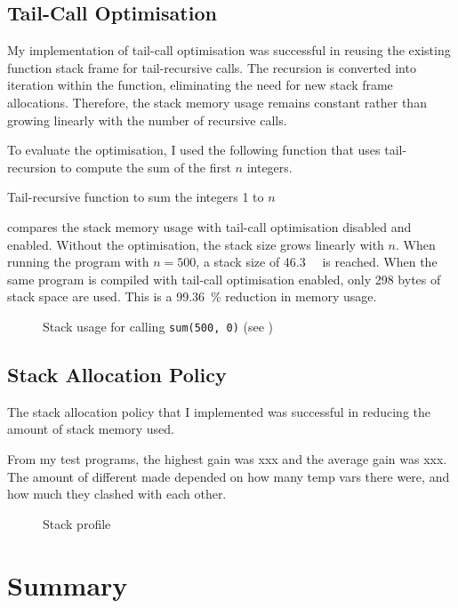 \documentclass[00-main.tex]{subfiles}
\begin{document}
\newcommand{\stackplot}[1]{\fbox{\resizebox{0.98\textwidth}{!}{}}}

\subsection{Tail-Call Optimisation}

My implementation of tail-call optimisation was successful in reusing the existing function stack frame for tail-recursive calls. The recursion is converted into iteration within the function, eliminating the need for new stack frame allocations.
Therefore, the stack memory usage remains constant rather than growing linearly with the number of recursive calls.

To evaluate the optimisation, I used the following function that uses tail-recursion to compute the sum of the first $n$ integers.

\begin{listing}[h]
  \caption{Tail-recursive function to sum the integers 1 to $n$}
  \label{lst:tail-recursive sum}
\end{listing}


 compares the stack memory usage with tail-call optimisation disabled and enabled.
Without the optimisation, the stack size grows linearly with $n$.
When running the program with $n=500$, a stack size of \SI{46.3}{\kilo\byte} is reached.
When the same program is compiled with tail-call optimisation enabled, only 298 bytes of stack space are used.
This is a \SI{99.36}{\percent} reduction in memory usage.

\begin{figure}[h]
  \centering
  \stackplot{22-tailcall-sum-compare-tailcallopt-without-stackopt.pgf}
  \caption{Stack usage for calling \texttt{sum(500, 0)} (see )}
  \label{fig:plot:tail-call optimisation stack use}
\end{figure}

\subsection{Stack Allocation Policy}

The stack allocation policy that I implemented was successful in reducing the amount of stack memory used.

From my test programs, the highest gain was xxx and the average gain was xxx.
The amount of different made depended on how many temp vars there were, and how much they clashed with each other.

\begin{figure}[h]
  \centering
  \stackplot{01-case-compare.pgf}
  \caption{Stack profile}
  \label{fig:}
\end{figure}

\section{Summary}
\end{document}
